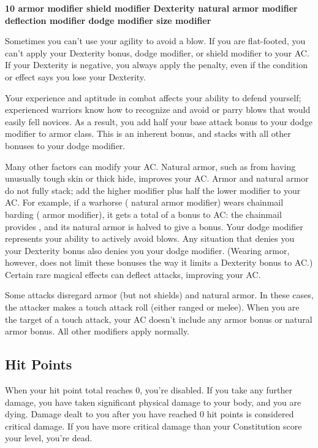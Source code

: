 {\centering \textbf{10 \add armor modifier \add shield modifier \add Dexterity \add natural armor modifier \add deflection modifier \add dodge modifier \add size modifier}}

Sometimes you can't use your agility to avoid a blow. If you are flat-footed, you can't apply your Dexterity bonus, dodge modifier, or shield modifier to your AC. If your Dexterity is negative, you always apply the penalty, even if the condition or effect says you lose your Dexterity.

 Your experience and aptitude in combat affects your ability to defend yourself; experienced warriors know how to recognize and avoid or parry blows that would easily fell novices. As a result, you add half your base attack bonus to your dodge modifier to armor class. This is an inherent bonus, and stacks with all other bonuses to your dodge modifier.

 Many other factors can modify your AC.
 Natural armor, such as from having unusually tough skin or thick hide, improves your AC. Armor and natural armor do not fully stack; add the higher modifier plus half the lower modifier to your AC. For example, if a warhorse ( natural armor modifier) wears chainmail barding ( armor modifier), it gets a total of a  bonus to AC: the chainmail provides , and its natural armor is halved to give a  bonus.
 Your dodge modifier represents your ability to actively avoid blows. Any situation that denies you your Dexterity bonus also denies you your dodge modifier. (Wearing armor, however, does not limit these bonuses the way it limits a Dexterity bonus to AC.)
 Certain rare magical effects can deflect attacks, improving your AC.

 Some attacks disregard armor (but not shields) and natural armor. In these cases, the attacker makes a touch attack roll (either ranged or melee). When you are the target of a touch attack, your AC doesn't include any armor bonus or natural armor bonus. All other modifiers apply normally.

\subsection{Hit Points}
When your hit point total reaches 0, you're disabled. If you take any further damage, you have taken significant physical damage to your body, and you are dying. Damage dealt to you after you have reached 0 hit points is considered critical damage. If you have more critical damage than your Constitution score \add your level, you're dead.

